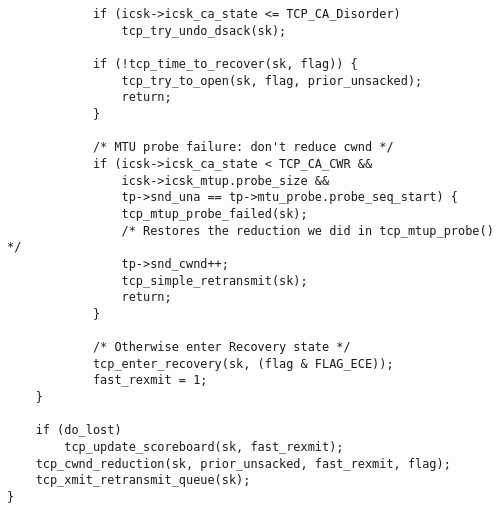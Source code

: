 \begin{verbatim}
			if (icsk->icsk_ca_state <= TCP_CA_Disorder)
				tcp_try_undo_dsack(sk);

			if (!tcp_time_to_recover(sk, flag)) {
				tcp_try_to_open(sk, flag, prior_unsacked);
				return;
			}

			/* MTU probe failure: don't reduce cwnd */
			if (icsk->icsk_ca_state < TCP_CA_CWR &&
				icsk->icsk_mtup.probe_size &&
				tp->snd_una == tp->mtu_probe.probe_seq_start) {
				tcp_mtup_probe_failed(sk);
				/* Restores the reduction we did in tcp_mtup_probe() */
				tp->snd_cwnd++;
				tcp_simple_retransmit(sk);
				return;
			}

			/* Otherwise enter Recovery state */
			tcp_enter_recovery(sk, (flag & FLAG_ECE));
			fast_rexmit = 1;
	}

	if (do_lost)
		tcp_update_scoreboard(sk, fast_rexmit);
	tcp_cwnd_reduction(sk, prior_unsacked, fast_rexmit, flag);
	tcp_xmit_retransmit_queue(sk);
}

\end{verbatim}
	
	

